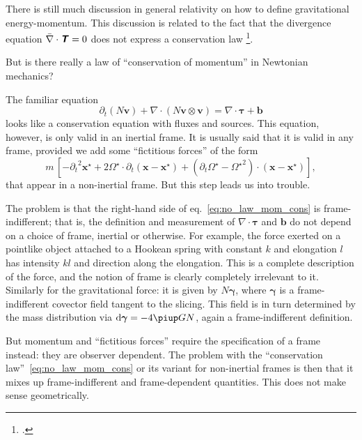 \documentclass[\ifafour a4paper,12pt,\else a5paper,10pt,\fi%
onecolumn,oneside,article,%
british%
]{memoir}
\theoremstyle{remark}
\theoremstyle{innote}
\newcommand*{\mathte}[1]{\textbf{\textit{\textsf{#1}}}}
\newcommand*{\citep}{\footcites}
\newcommand*{\de}{\partialup}%
\newcommand*{\pu}{\piup}%
\newcommand*{\di}{\mathrm{d}}%
\renewcommand*{\|}[1][]{\nonscript\,#1\vert\nonscript\;\mathopen{}}
\newcommand*{\sect}{\S}%
\newcommand*{\eqn}{eq.}%
\newcommand*{\yd}{N}
\newcommand*{\yTT}{\tau}
\newcommand*{\yT}{\bm{\yTT}}
\newcommand*{\yTTf}{T}
\newcommand*{\yTf}{\mathte{\yTTf}}
\newcommand*{\ybbf}{b}
\newcommand*{\ybf}{\bm{\ybbf}}
\newcommand*{\yxxt}{x}
\newcommand*{\yxt}{\bm{\yxxt}}
\newcommand*{\yxto}{\bm{\yxxt}^{\mathord{\star}}}
\newcommand*{\yvvt}{v}
\newcommand*{\yvt}{\bm{\yvvt}}
\newcommand*{\yffg}{\gamma}
\newcommand*{\yfg}{\bm{\yffg}}
\newcommand*{\yomm}{\varOmega}
\newcommand*{\yom}{\bm{\yomm}^{\mathord{\star}}}
\newcommand*{\ynab}{\nabla}
\newcommand*{\ynaf}{\Bar{\nabla}}
\begin{document}
There is still much discussion in general relativity on how to define
gravitational energy-momentum. This discussion is related to the fact that
the divergence equation $\ynaf\cdot\yTf=0$ does not express a conservation
law \citep[\sect~96]{landauetal1939_t1996}{arminjon2016}.

But is there really a law of \enquote{conservation of momentum} in
Newtonian mechanics?

The familiar equation
\begin{equation}
  \label{eq:no_law_mom_cons}
  \de_t(\yd\yvt) + \ynab\cdot(\yd\yvt\otimes\yvt) = \ynab\cdot\yT +\ybf
\end{equation}
looks like a conservation equation with fluxes and sources. This equation,
however, is only valid in an inertial frame. It is usually said that it is
valid in any frame, provided we add some \enquote{fictitious forces} of the
form
\begin{equation}
  \label{eq:fictitious_forces}
  m\, [-{\de_t}^2\yxto%
  + 2\yom\cdot\de_t(\yxt-\yxto) + (\de_t\yom-{\yom}^2)\cdot(\yxt-\yxto)],
\end{equation}
that appear in a non-inertial frame. But this step leads us into trouble.

The problem is that the right-hand side of \eqn~\eqref{eq:no_law_mom_cons}
is frame-indifferent; that is, the definition and measurement of
$\ynab\cdot\yT$ and $\ybf$ do not depend on a choice of frame, inertial or
otherwise. For example, the force exerted on a pointlike object attached to
a Hookean spring with constant $k$ and elongation $l$ has intensity $kl$
and direction along the elongation. This is a complete description of the
force, and the notion of frame is clearly completely irrelevant to it.
Similarly for the gravitational force: it is given by $\yd\yfg$, where
$\yfg$ is a frame-indifferent covector field tangent to the slicing. This
field is in turn determined by the mass distribution via
$\di\yfg = - 4\pu G \yd$, again a frame-indifferent definition.

But momentum and \enquote{fictitious forces} require the specification of a
frame instead: they are observer dependent. The problem with the
\enquote{conservation law}~\eqref{eq:no_law_mom_cons} or its variant for
non-inertial frames is then that it mixes up frame-indifferent and
frame-dependent quantities. This does not make sense geometrically.
\end{document}
